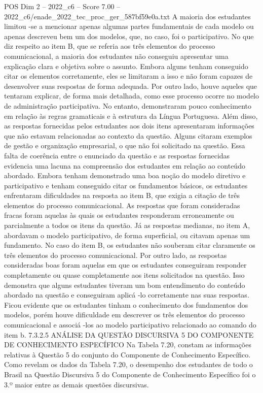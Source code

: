 \begin{textsample}{POS Dim 2 – 2022\_c6 – Score 7.00 – 2022\_c6/enade\_2022\_tec\_proc\_ger\_587bf59e0a.txt}
A maioria dos estudantes limitou -se a mencionar apenas algumas partes fundamentais de cada modelo ou apenas descreveu bem um dos modelos, que, no caso, foi o participativo.
No que diz respeito ao item B, que se referia aos três elementos do processo comunicacional, a maioria dos estudantes não conseguiu apresentar uma explicação clara e objetiva sobre o assunto.
Embora alguns tenham conseguido citar os elementos corretamente, eles se limitaram a isso e não foram capazes de desenvolver suas respostas de forma adequada.
Por outro lado, houve aqueles que tentaram explicar, de forma mais detalhada, como esse processo ocorre no modelo de administração participativa.
No entanto, demonstraram pouco conhecimento em relação às regras gramaticais e à estrutura da Língua Portuguesa.
Além disso, as respostas fornecidas pelos estudantes aos dois itens apresentaram informações que não estavam relacionadas ao contexto da questão.
Alguns citaram exemplos de gestão e organização empresarial, o que não foi solicitado na questão.
Essa falta de coerência entre o enunciado da questão e as respostas fornecidas evidencia uma lacuna na compreensão dos estudantes em relação ao conteúdo abordado.
Embora tenham demonstrado uma boa noção do modelo diretivo e participativo e tenham conseguido citar os fundamentos básicos, os estudantes enfrentaram dificuldades na resposta ao item B, que exigia a citação de três elementos do processo comunicacional.
As respostas que foram consideradas fracas foram aquelas às quais os estudantes responderam erroneamente ou parcialmente a todos os itens da questão.
Já as respostas medianas, no item A, abordavam o modelo participativo, de forma superficial, ou citavam apenas um fundamento.
No caso do item B, os estudantes não souberam citar claramente os três elementos do processo comunicacional.
Por outro lado, as respostas consideradas boas foram aquelas em que os estudantes conseguiram responder completamente ou quase completamente aos itens solicitados na questão.
Isso demonstra que alguns estudantes tiveram um bom entendimento do conteúdo abordado na questão e conseguiram aplicá -lo corretamente nas suas respostas.
Ficou evidente que os estudantes tinham o conhecimento dos fundamentos dos modelos, porém houve dificuldade em descrever os três elementos do processo comunicacional e associá -los ao modelo participativo relacionado ao comando do item b. 7.3.2.5 ANÁLISE DA QUESTÃO DISCURSIVA 5 DO COMPONENTE DE CONHECIMENTO ESPECÍFICO Na Tabela 7.20, constam as informações relativas à Questão 5 do conjunto do Componente de Conhecimento Específico.
Como revelam os dados da Tabela 7.20, o desempenho dos estudantes de todo o Brasil na Questão Discursiva 5 do Componente de Conhecimento Específico foi o 3.º maior entre as demais questões discursivas.

\end{textsample}
